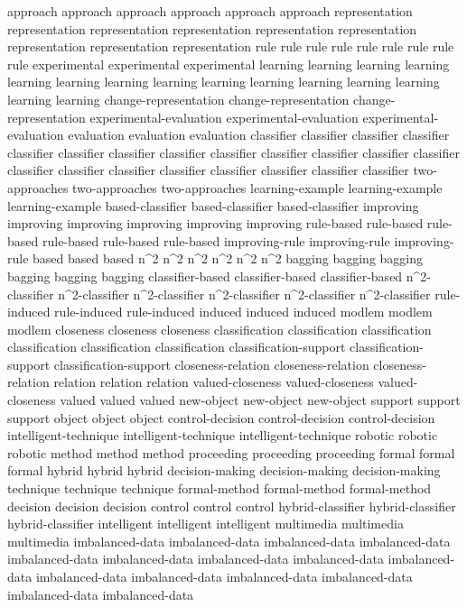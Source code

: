approach	approach	approach	approach	approach	approach	
representation	representation	representation	representation	representation	representation	representation	representation	representation	
rule	rule	rule	rule	rule	rule	rule	rule	rule	
experimental	experimental	experimental	
learning	learning	learning	learning	learning	learning	learning	learning	learning	learning	learning	learning	learning	learning	learning	
change-representation	change-representation	change-representation	
experimental-evaluation	experimental-evaluation	experimental-evaluation	
evaluation	evaluation	evaluation	
classifier	classifier	classifier	classifier	classifier	classifier	classifier	classifier	classifier	classifier	classifier	classifier	classifier	classifier	classifier	classifier	classifier	classifier	classifier	classifier	classifier	
two-approaches	two-approaches	two-approaches	
learning-example	learning-example	learning-example	
based-classifier	based-classifier	based-classifier	
improving	improving	improving	improving	improving	improving	
rule-based	rule-based	rule-based	rule-based	rule-based	rule-based	
improving-rule	improving-rule	improving-rule	
based	based	based	
n^2	n^2	n^2	n^2	n^2	n^2	
bagging	bagging	bagging	bagging	bagging	bagging	
classifier-based	classifier-based	classifier-based	
n^2-classifier	n^2-classifier	n^2-classifier	n^2-classifier	n^2-classifier	n^2-classifier	
rule-induced	rule-induced	rule-induced	
induced	induced	induced	
modlem	modlem	modlem	
closeness	closeness	closeness	
classification	classification	classification	classification	classification	classification	
classification-support	classification-support	classification-support	
closeness-relation	closeness-relation	closeness-relation	
relation	relation	relation	
valued-closeness	valued-closeness	valued-closeness	
valued	valued	valued	
new-object	new-object	new-object	
support	support	support	
object	object	object	
control-decision	control-decision	control-decision	
intelligent-technique	intelligent-technique	intelligent-technique	
robotic	robotic	robotic	
method	method	method	
proceeding	proceeding	proceeding	
formal	formal	formal	
hybrid	hybrid	hybrid	
decision-making	decision-making	decision-making	
technique	technique	technique	
formal-method	formal-method	formal-method	
decision	decision	decision	
control	control	control	
hybrid-classifier	hybrid-classifier	hybrid-classifier	
intelligent	intelligent	intelligent	
multimedia	multimedia	multimedia	
imbalanced-data	imbalanced-data	imbalanced-data	imbalanced-data	imbalanced-data	imbalanced-data	imbalanced-data	imbalanced-data	imbalanced-data	imbalanced-data	imbalanced-data	imbalanced-data	imbalanced-data	imbalanced-data	imbalanced-data	

